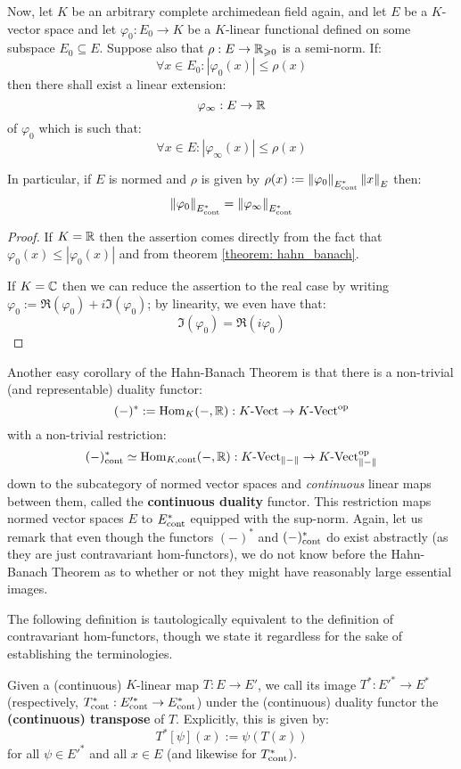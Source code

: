         \begin{corollary} \label{coro: norm_extensions}
            Now, let $K$ be an arbitrary complete archimedean field again, and let $E$ be a $K$-vector space and let $\varphi_0: E_0 \to K$ be a $K$-linear functional defined on some subspace $E_0 \subseteq E$. Suppose also that $\rho: E \to \mathbb{R}_{\geqslant 0}$ is a semi-norm. If:
                $$\forall x \in E_0: |\varphi_0(x)| \leq \rho(x)$$
            then there shall exist a linear extension:
                $$\varphi_{\infty}: E \to \mathbb{R}$$
            of $\varphi_0$ which is such that:
                $$\forall x \in E: |\varphi_{\infty}(x)| \leq \rho(x)$$

            In particular, if $E$ is normed and $\rho$ is given by $\rho(x) := \left\| {\varphi_0} \right\|_{E^*_{\mathrm{cont}}} \left\| {x} \right\|_E$ then:
                $$\left\| {\varphi_0} \right\|_{E^*_{\mathrm{cont}}} = \left\| {\varphi_{\infty}} \right\|_{E^*_{\mathrm{cont}}}$$
        \end{corollary}
            \begin{proof}
                If $K = \mathbb{R}$ then the assertion comes directly from the fact that $\varphi_0(x) \leq |\varphi_0(x)|$ and from theorem \ref{theorem: hahn_banach}.

                If $K = \mathbb{C}$ then we can reduce the assertion to the real case by writing $\varphi_0 := \Re(\varphi_0) + i \Im(\varphi_0)$; by linearity, we even have that:
                    $$\Im(\varphi_0) = \Re(i \varphi_0)$$
            \end{proof}

        Another easy corollary of the Hahn-Banach Theorem is that there is a non-trivial (and representable) duality functor:
            $$(-)^* := \mathrm{Hom}_K(-, \mathbb{R}): K\text{-}\mathrm{Vect} \to K\text{-}\mathrm{Vect}^{\mathrm{op}}$$
        with a non-trivial restriction:
            $$(-)^*_{\mathrm{cont}} \simeq \mathrm{Hom}_{K, \mathrm{cont}}(-, \mathbb{R}): K\text{-}\mathrm{Vect}_{\left\| {-} \right\|} \to K\text{-}\mathrm{Vect}_{\left\| {-} \right\|}^{\mathrm{op}}$$
        down to the subcategory of normed vector spaces and \textit{continuous} linear maps between them, called the \textbf{continuous duality} functor. This restriction maps normed vector spaces $E$ to $E^*_{\mathrm{cont}}$ equipped with the sup-norm. Again, let us remark that even though the functors $(-)^*$ and $(-)^*_{\mathrm{cont}}$ do exist abstractly (as they are just contravariant hom-functors), we do not know before the Hahn-Banach Theorem as to whether or not they might have reasonably large essential images.
        
        The following definition is tautologically equivalent to the definition of contravariant hom-functors, though we state it regardless for the sake of establishing the terminologies. 
        \begin{definition}[Transposition] \label{def: transposition}
            Given a (continuous) $K$-linear map $T: E \to E'$, we call its image $T^*: E'^* \to E^*$ (respectively, $T^*_{\mathrm{cont}}: E'^*_{\mathrm{cont}} \to E^*_{\mathrm{cont}}$) under the (continuous) duality functor the \textbf{(continuous) transpose} of $T$. Explicitly, this is given by:
                $$T^*[\psi](x) := \psi( T(x) )$$
            for all $\psi \in E'^*$ and all $x \in E$ (and likewise for $T^*_{\mathrm{cont}}$).
        \end{definition}


